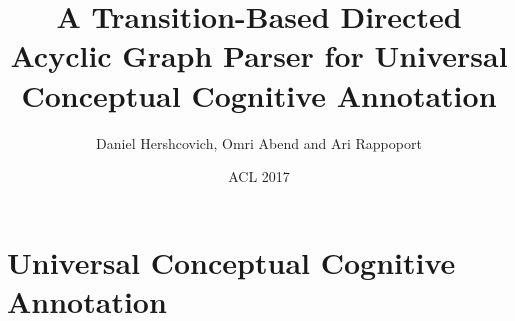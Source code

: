 \documentclass[t]{beamer}
\begin{document}
\title[A Transition-Based DAG Parser for UCCA]{A Transition-Based Directed Acyclic Graph Parser for Universal Conceptual Cognitive Annotation}
\author{Daniel Hershcovich, Omri Abend and Ari Rappoport}
\date{ACL 2017}

\begin{frame}
\titlepage
\end{frame}



\section{Universal Conceptual Cognitive Annotation}
\end{document}
